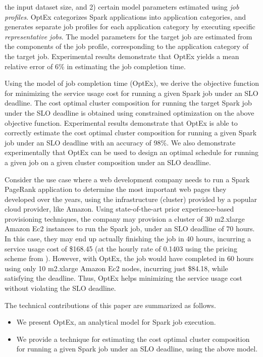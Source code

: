 \documentclass[conference]{IEEEtran}
\begin{document}
   the input dataset size, and 2) certain model parameters estimated using \emph{job profiles}. OptEx categorizes Spark applications into
  application categories, and generates separate job profiles for each application category by executing
  specific \emph{representative jobs}. The model parameters for the target job are estimated from the components
  of the job profile, corresponding to the application category of the target job.
  Experimental results demonstrate that OptEx yields
a mean relative error of 6\% in
estimating the job completion time. \par  Using the model of job completion time (OptEx), we derive the objective
 function for minimizing the service usage cost for running a given Spark job under an SLO deadline.
   The cost optimal cluster composition for running the target Spark job under the SLO deadline is obtained using constrained
    optimization on the above objective function.
Experimental results demonstrate that OptEx is able to correctly
  estimate the cost optimal cluster composition for running a given Spark job under an SLO deadline with
  an accuracy of 98\%.
  We also demonstrate experimentally that OptEx can be used to design
an optimal schedule for running a given job on a given cluster composition under an SLO deadline. \par Consider the use case where a web development company needs to run a Spark PageRank application to determine the most important web pages they developed over the years, using the infrastructure (cluster)
 provided by a popular cloud provider, like Amazon. Using state-of-the-art \cite{daniel2011prediction, Imai:2013:ARP:2588611.2588688, singer2010towards}
 prior experience-based provisioning techniques, the company may provision a  cluster of 30 m2.xlarge Amazon Ec2 instances
 to run the Spark job, under an SLO deadline of 70 hours. In this case,  they may end up actually
finishing the job in 40 hours, incurring a service usage cost of \$168.45 (at the hourly rate of 0.1403 using the pricing
scheme from \cite{inc_amazon_2008}).
 However, with OptEx, the job would have completed in 60 hours using only 10 m2.xlarge Amazon Ec2 nodes, incurring just \$84.18,
 while satisfying the deadline. Thus, OptEx helps minimizing the service
 usage cost without violating the SLO deadline.
\par The technical contributions of this paper are summarized as follows.
  \begin{itemize}
  \item  We present OptEx, an analytical model for Spark \cite{Zaharia:2012:RDD:2228298.2228301} job execution. \item We provide a technique for estimating the cost optimal cluster composition for running a given Spark job under an SLO deadline, using the above model.
  \end{itemize}
\end{document}

